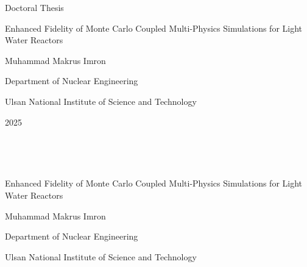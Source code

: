 \documentclass[11pt,a4paper,onecolumn,oneside]{report}
\begin{document}


\begin{center}
\LARGE Doctoral Thesis

\vspace{3cm}
\huge Enhanced Fidelity of Monte Carlo Coupled Multi-Physics Simulations for Light Water Reactors

\vfill

\LARGE Muhammad Makrus Imron

\vspace{2cm}

\LARGE Department of Nuclear Engineering 

\vspace{2cm}

\LARGE Ulsan National Institute of Science and Technology
\vspace{2cm}

\LARGE 2025

\end{center}
\thispagestyle{empty}
\clearpage

\begin{center}
\hbox{ }

\hbox{ }

\huge Enhanced Fidelity of Monte Carlo Coupled Multi-Physics Simulations for Light Water Reactors 

\vspace{5cm}

\LARGE Muhammad Makrus Imron

\vspace{6cm}

\LARGE Department of Nuclear Engineering 

\vspace{2cm}

\LARGE Ulsan National Institute of Science and Technology

\end{center}
\thispagestyle{empty}
\clearpage

\end{document}
